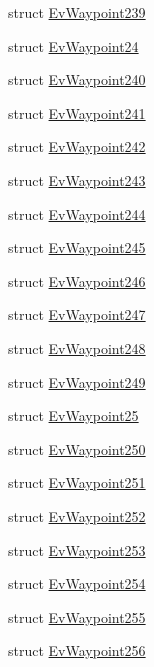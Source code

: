 \begin{DoxyCompactItemize}
\item 
struct \hyperlink{structmove__base__z__client_1_1EvWaypoint239}{Ev\+Waypoint239}
\item 
struct \hyperlink{structmove__base__z__client_1_1EvWaypoint24}{Ev\+Waypoint24}
\item 
struct \hyperlink{structmove__base__z__client_1_1EvWaypoint240}{Ev\+Waypoint240}
\item 
struct \hyperlink{structmove__base__z__client_1_1EvWaypoint241}{Ev\+Waypoint241}
\item 
struct \hyperlink{structmove__base__z__client_1_1EvWaypoint242}{Ev\+Waypoint242}
\item 
struct \hyperlink{structmove__base__z__client_1_1EvWaypoint243}{Ev\+Waypoint243}
\item 
struct \hyperlink{structmove__base__z__client_1_1EvWaypoint244}{Ev\+Waypoint244}
\item 
struct \hyperlink{structmove__base__z__client_1_1EvWaypoint245}{Ev\+Waypoint245}
\item 
struct \hyperlink{structmove__base__z__client_1_1EvWaypoint246}{Ev\+Waypoint246}
\item 
struct \hyperlink{structmove__base__z__client_1_1EvWaypoint247}{Ev\+Waypoint247}
\item 
struct \hyperlink{structmove__base__z__client_1_1EvWaypoint248}{Ev\+Waypoint248}
\item 
struct \hyperlink{structmove__base__z__client_1_1EvWaypoint249}{Ev\+Waypoint249}
\item 
struct \hyperlink{structmove__base__z__client_1_1EvWaypoint25}{Ev\+Waypoint25}
\item 
struct \hyperlink{structmove__base__z__client_1_1EvWaypoint250}{Ev\+Waypoint250}
\item 
struct \hyperlink{structmove__base__z__client_1_1EvWaypoint251}{Ev\+Waypoint251}
\item 
struct \hyperlink{structmove__base__z__client_1_1EvWaypoint252}{Ev\+Waypoint252}
\item 
struct \hyperlink{structmove__base__z__client_1_1EvWaypoint253}{Ev\+Waypoint253}
\item 
struct \hyperlink{structmove__base__z__client_1_1EvWaypoint254}{Ev\+Waypoint254}
\item 
struct \hyperlink{structmove__base__z__client_1_1EvWaypoint255}{Ev\+Waypoint255}
\item 
struct \hyperlink{structmove__base__z__client_1_1EvWaypoint256}{Ev\+Waypoint256}
\item 

\end{DoxyCompactItemize}
